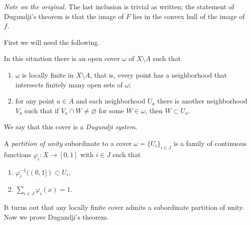 \noindent
{\it Note on the original.} The last
inclusion is trivial as written; the
statement of Dugundji's theorem is that
the image of $F$ lies in the convex
hull of the image of $f$.

First we will need the following.

\begin{lemma}
\label{lemma-dugundji-system}
In this situation there is an open
cover $\omega$ of $X\setminus A$ such
that
\begin{enumerate}
\item $\omega$ is locally finite in
$X\setminus A$, that is, every point
has a neighborhood that intersects
finitely many open sets of $\omega$;
\item for any point $a\in A$ and each
neighborhood $U_a$ there is another
neighborhood $V_a$ such that if
$V_a\cap W\neq\varnothing$ for some
$W\in\omega$, then $W\subset U_a$.
\end{enumerate}
We say that this cover is a
{\it Dugundji system}.
\end{lemma}

\begin{definition}
\label{definition-partition-of-unity}
A {\it partition of unity} subordinate
to a cover $\omega=\{U_i\}_{i\in J}$ is
a family of continuous functions
$\varphi_i:X\to[0,1]$ with $i\in J$
such that
\begin{enumerate}
\item
$\varphi_i^{-1}((0,1])\subset U_i$,
\item $\sum_{i\in J}\varphi_i(x)=1$.
\end{enumerate}
\end{definition}

It turns out that any locally finite
cover admits a subordinate partition of
unity. Now we prove Dugundji's theorem.

